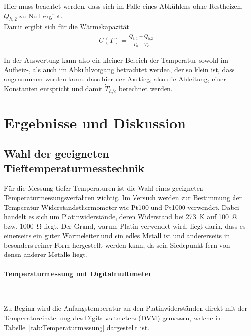 \documentclass[parskip=half, a4paper,twoside,final]{article}
\begin{document}
Hier muss beachtet werden, dass sich im Falle eines Abkühlens ohne Restheizen, $\dot{Q}_{h,2}$ zu Null ergibt.\\
Damit ergibt sich für die Wärmekapazität
\begin{align}\label{equ:DS}
  C(T) = \frac{\dot{Q}_{h,1}-\dot{Q}_{h,2}}{\dot{T}_h - \dot{T}_c}
\end{align}

In der Auswertung kann also ein kleiner Bereich der Temperatur sowohl im Aufheiz-, als auch im Abkühlvorgang betrachtet werden, der so klein ist, dass angenommen werden kann, dass hier der Anstieg, also die Ableitung, einer Konstanten entspricht und damit $\dot{T}_{h/c}$ berechnet werden.

\newpage
\section{Ergebnisse und Diskussion}\label{sec:ErgebnisseUndDiskussion}

\subsection{Wahl der geeigneten Tieftemperaturmesstechnik}
Für die Messung tiefer Temperaturen ist die Wahl eines geeigneten Temperaturmessungsverfahren wichtig. Im Versuch werden zur Bestimmung der Temperatur Widerstandsthermometer wie Pt100 und Pt1000 verwendet. Dabei handelt es sich um Platinwiderstände, deren Widerstand bei \SI{273}{\kelvin} auf \SI{100}{\ohm} bzw. \SI{1000}{\ohm} liegt. Der Grund, warum Platin verwendet wird, liegt darin, dass es einerseits ein guter Wärmeleiter und ein edles Metall ist und andererseits in besonders reiner Form hergestellt werden kann, da sein Siedepunkt fern von denen anderer Metalle liegt.

\paragraph{Temperaturmessung mit Digitalmultimeter}$~$

Zu Beginn wird die Anfangstemperatur an den Platinwiderständen direkt mit der Temperatureinstellung des Digitalvoltmeters (DVM) gemessen, welche in Tabelle~\ref{tab:Temperaturmessung} dargestellt ist.
\end{document}

